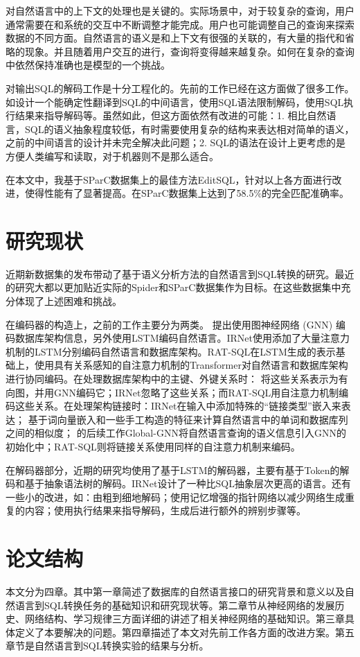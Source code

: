 对自然语言中的上下文的处理也是关键的。实际场景中，对于较复杂的查询，用户通常需要在和系统的交互中不断调整才能完成。用户也可能调整自己的查询来探索数据的不同方面。自然语言的语义是和上下文有很强的关联的，有大量的指代和省略的现象。并且随着用户交互的进行，查询将变得越来越复杂。如何在复杂的查询中依然保持准确也是模型的一个挑战。

对输出SQL的解码工作是十分工程化的。先前的工作已经在这方面做了很多工作。如设计一个能确定性翻译到SQL的中间语言，使用SQL语法限制解码，使用SQL执行结果来指导解码等。虽然如此，但这方面依然有改进的可能：1. 相比自然语言，SQL的语义抽象程度较低，有时需要使用复杂的结构来表达相对简单的语义，之前的中间语言的设计并未完全解决此问题；2. SQL的语法在设计上更考虑的是方便人类编写和读取，对于机器则不是那么适合。

在本文中，我基于SParC数据集上的最佳方法EditSQL\cite{edit19}，针对以上各方面进行改进，使得性能有了显著提高。在SParC数据集上达到了58.5\%的完全匹配准确率。

\section{研究现状}

近期新数据集的发布带动了基于语义分析方法的自然语言到SQL转换的研究。最近的研究大都以更加贴近实际的Spider和SParC数据集作为目标。在这些数据集中充分体现了上述困难和挑战。

在编码器的构造上，之前的工作主要分为两类。 \citet{gnn19}提出使用图神经网络 (GNN) 编码数据库架构信息，另外使用LSTM\cite{lstm97}编码自然语言。IRNet\cite{irnet19}使用添加了大量注意力机制的LSTM分别编码自然语言和数据库架构。RAT-SQL\cite{ratsql19}在LSTM生成的表示基础上，使用具有关系感知的自注意力机制的Transformer\cite{attn17}对自然语言和数据库架构进行协同编码。在处理数据库架构中的主键、外键关系时： \citet{gnn19}将这些关系表示为有向图，并用GNN编码它；IRNet忽略了这些关系；而RAT-SQL用自注意力机制编码这些关系。在处理架构链接时：IRNet在输入中添加特殊的“链接类型”嵌入来表达； \citet{gnn19}基于词向量嵌入和一些手工构造的特征来计算自然语言中的单词和数据库列之间的相似度； \citet{gnn19}的后续工作Global-GNN\cite{ggcn19}将自然语言查询的语义信息引入GNN的初始化中；RAT-SQL则将链接关系使用同样的自注意力机制来编码。

在解码器部分，近期的研究均使用了基于LSTM的解码器，主要有基于Token的解码和基于抽象语法树的解码。IRNet设计了一种比SQL抽象层次更高的语言。还有一些小的改进，如：由粗到细地解码\cite{irnet19,coarse-to-fine18}；使用记忆增强的指针网络以减少网络生成重复的内容；使用执行结果来指导解码\cite{wang2018execution-guided}，生成后进行额外的辨别步骤等\cite{ggcn19}。

\section{论文结构}

本文分为四章。其中第一章简述了数据库的自然语言接口的研究背景和意义以及自然语言到SQL转换任务的基础知识和研究现状等。第二章节从神经网络的发展历史、网络结构、学习规律三方面详细的讲述了相关神经网络的基础知识。第三章具体定义了本要解决的问题。第四章描述了本文对先前工作各方面的改进方案。第五章节是自然语言到SQL转换实验的结果与分析。
